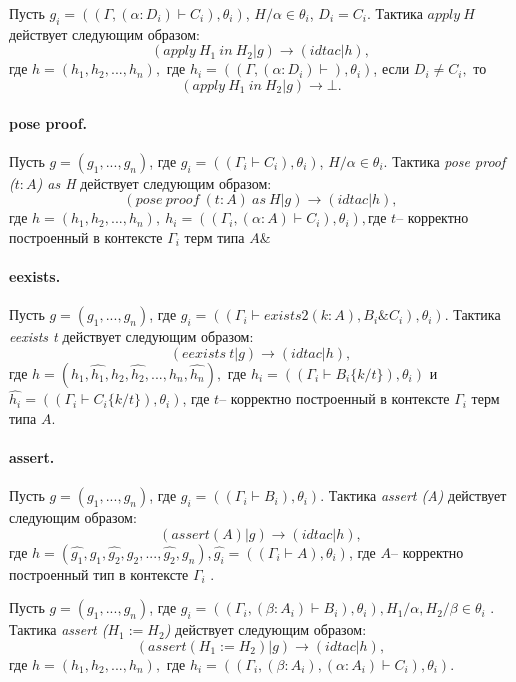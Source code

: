 \documentclass[12pt]{article}
\begin{document}
Пусть $g_i = ((\Gamma, (\alpha:  D_i) \vdash C_i), \theta_i)$, $H/\alpha \in \theta_i$, $D_i = C_i$.
Тактика $apply\ H$ действует следующим образом:
$$(apply\ H_1\ in\ H_2|g) \xrightarrow{} (idtac| h),$$
где $h=(h_1,h_2,...,h_n),$ где $h_i= ((\Gamma, (\alpha:  D_i) \vdash), \theta_i)$,
если $D_i \neq C_i,$ то
$$(apply\ H_1\ in\ H_2|g) \xrightarrow{} \bot.$$

\paragraph{pose proof.}

Пусть $g = (g_1, ..., g_n)$, где $g_i = ((\Gamma_i \vdash C_i), \theta_i)$, $H/\alpha \in \theta_i$.
Тактика \textit{pose proof ($t:A$) as H}  действует следующим образом:
$$(pose\ proof\ (t:A)\ as\ H|g) \xrightarrow{} (idtac| h),$$ 
где $h=(h_1,h_2,...,h_n),\ h_i= ((\Gamma_i, (\alpha: A) \vdash C_i), \theta_i),$где $t$-- корректно построенный в контексте $\Gamma_i$ терм типа $A$&

\paragraph{eexists.}
Пусть $g = (g_1, ..., g_n)$, где $g_i = ((\Gamma_i \vdash exists2 (k : A), B_i \& C_i), \theta_i)$.
Тактика \textit{eexists t}  действует следующим образом:
$$(eexists\ t|g) \xrightarrow{} (idtac| h),$$ 
где $h=(h_1, \hat{h_1}, h_2,\hat{h_2},...,h_n,\hat{h_n}),$ где $h_i= ((\Gamma_i \vdash B_i\{k/t\}), \theta_i)$ и $\hat{h_i}= ((\Gamma_i \vdash C_i\{k/t\}), \theta_i)$, где $t$-- корректно построенный в контексте $\Gamma_i$ терм типа $A$.

\paragraph{assert.}
Пусть $g = (g_1, ..., g_n)$, где $g_i = ((\Gamma_i \vdash B_i), \theta_i)$.
Тактика \textit{assert (A)}  действует следующим образом:
$$(assert (A)|g) \xrightarrow{} (idtac| h),$$ 
где $h=(\hat{g_1},g_1,\hat{g_2},g_2,...,\hat{g_2},g_n), \hat{g_i} = ((\Gamma_i \vdash A), \theta_i)$, где $A$-- корректно построенный тип в контексте $\Gamma_i$ .

Пусть $g = (g_1, ..., g_n)$, где $g_i = ((\Gamma_i, (\beta:A_i) \vdash B_i), \theta_i), H_1/\alpha, H_2/\beta \in \theta_i$ .
Тактика \textit{assert ($H_1:=H_2$)}  действует следующим образом:
$$(assert (H_1:=H_2)|g) \xrightarrow{} (idtac| h),$$ 
где $h=(h_1,h_2,...,h_n),$ где $h_i= ((\Gamma_i, (\beta: A_i),(\alpha: A_i) \vdash C_i), \theta_i)$.
\end{document}
